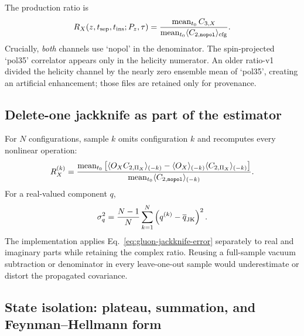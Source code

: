 \documentclass[11pt]{article}
\numberwithin{equation}{section}
\begin{document}
The production ratio is
\begin{equation}
 R_X(z,t_{\rm sep},t_{\rm ins};P_z,\tau)
 =\frac{\operatorname{mean}_{t_0} C_{3,X}}
        {\operatorname{mean}_{t_0}
          \langle C_{2,{\tt nopol}}\rangle_{\rm cfg}}.
 \label{eq:flowed-gluon-ratio}
\end{equation}
Crucially, \emph{both} channels use `nopol' in the denominator.  The
spin-projected `pol35' correlator appears only in the helicity numerator.  An
older ratio-v1 divided the helicity channel by the nearly zero ensemble mean
of `pol35', creating an artificial enhancement; those files are retained
only for provenance.

\subsection{Delete-one jackknife as part of the estimator}

For \(N\) configurations, sample \(k\) omits configuration \(k\) and
recomputes every nonlinear operation:
\begin{equation}
 R_X^{(k)}=
 \frac{\operatorname{mean}_{t_0}
   \left[\langle O_XC_{2,\Pi_X}\rangle_{(-k)}
   -\langle O_X\rangle_{(-k)}
    \langle C_{2,\Pi_X}\rangle_{(-k)}\right]}
 {\operatorname{mean}_{t_0}
    \langle C_{2,{\tt nopol}}\rangle_{(-k)}}.
 \label{eq:gluon-jackknife-estimator}
\end{equation}
For a real-valued component \(q\),
\begin{equation}
 \sigma_q^2=\frac{N-1}{N}\sum_{k=1}^{N}
  \left(q^{(k)}-\overline q_{\rm JK}\right)^2.
 \label{eq:gluon-jackknife-error}
\end{equation}
The implementation applies Eq.~\eqref{eq:gluon-jackknife-error} separately
to real and imaginary parts while retaining the complex ratio.  Reusing a
full-sample vacuum subtraction or denominator in every leave-one-out sample
would underestimate or distort the propagated covariance.

\subsection{State isolation: plateau, summation, and Feynman--Hellmann form}
\end{document}
